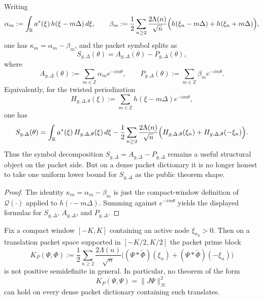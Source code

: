 \begin{lemma}\label{lem:packet-symbol-decomposition}
Writing
\[
  \alpha_m:=\int_{\mathbb R} a^*(\xi)\,h(\xi-m\Delta)\,d\xi,
  \qquad
  \beta_m:=\frac12\sum_{n\ge2}\frac{2\Lambda(n)}{\sqrt n}
  \Bigl(h(\xi_n-m\Delta)+h(\xi_n+m\Delta)\Bigr),
\]
one has $\kappa_m=\alpha_m-\beta_m$, and
the packet symbol splits as
\[
  S_{g,\Delta}(\theta)=A_{g,\Delta}(\theta)-P_{g,\Delta}(\theta),
\]
where
\[
  A_{g,\Delta}(\theta)
  :=
  \sum_{m\in\mathbb Z} \alpha_m e^{-im\theta},
  \qquad
  P_{g,\Delta}(\theta)
  :=
  \sum_{m\in\mathbb Z} \beta_m e^{-im\theta}.
\]
Equivalently, for the twisted periodization
\[
  H_{g,\Delta,\theta}(\xi):=\sum_{m\in\mathbb Z} h(\xi-m\Delta)e^{-im\theta},
\]
one has
\[
  S_{g,\Delta}(\theta)
  =
  \int_{\mathbb R} a^*(\xi)\,H_{g,\Delta,\theta}(\xi)\,d\xi
  -
  \frac12\sum_{n\ge2}\frac{2\Lambda(n)}{\sqrt n}
  \Bigl(H_{g,\Delta,\theta}(\xi_n)+H_{g,\Delta,\theta}(-\xi_n)\Bigr).
\]
Thus the symbol decomposition $S_{g,\Delta}=A_{g,\Delta}-P_{g,\Delta}$ remains a
useful structural object on the packet side. But on a dense packet dictionary it
is no longer honest to take one uniform lower bound for $S_{g,\Delta}$ as the
public theorem shape.
\end{lemma}

\begin{proof}
The identity $\kappa_m=\alpha_m-\beta_m$ is just the compact-window definition
of $\mathcal Q(\cdot)$ applied to $h(\cdot-m\Delta)$. Summing against
$e^{-im\theta}$ yields the displayed formulas for $S_{g,\Delta}$,
$A_{g,\Delta}$, and $P_{g,\Delta}$.
\end{proof}

\begin{proposition}\label{prop:packet-prime-not-psd}
Fix a compact window $[-K,K]$ containing an active node $\xi_{n_0}>0$. Then on a
translation packet space supported in $[-K/2,K/2]$ the packet prime block
\[
  K_P(\Psi,\Phi)
  :=
  \frac12\sum_{n\ge2}\frac{2\Lambda(n)}{\sqrt n}
  \bigl((\Psi * \widetilde{\Phi})(\xi_n)+(\Psi * \widetilde{\Phi})(-\xi_n)\bigr)
\]
is not positive semidefinite in general. In particular, no theorem of the form
\[
  K_P(\Psi,\Psi)=\|J\Psi\|_{\mathcal H}^2
\]
can hold on every dense packet dictionary containing such translates.
\end{proposition}

